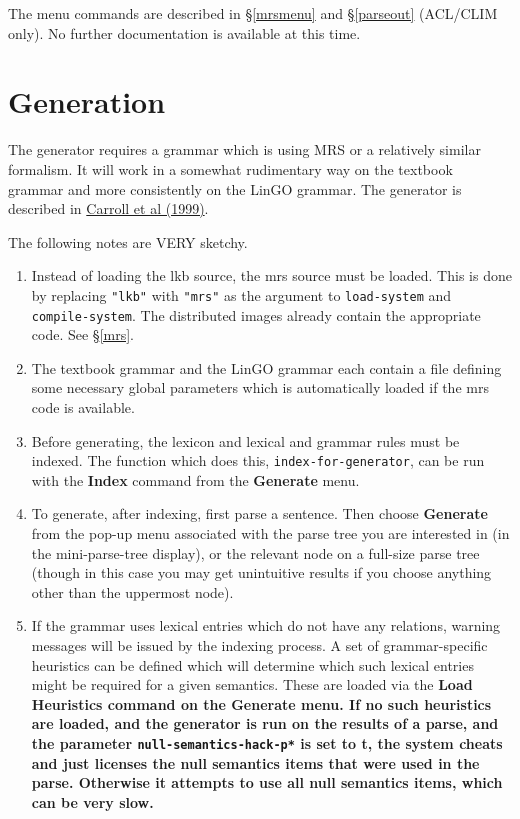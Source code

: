 \documentclass[12pt]{report}
\newcommand{\functionname}[1]{{\tt #1}}
\newcommand{\lkbparam}[1]{{\tt #1}}
\newcommand{\lkbmenucommand}{\bf}
\begin{document}
The menu commands are described in \S\ref{mrsmenu} and
\S\ref{parseout} (ACL/CLIM only).
No further documentation is available at this time.

\section{Generation}
\label{generator}

The generator requires a grammar which is using MRS or a relatively
similar formalism.  It will work in a somewhat rudimentary way on the
textbook grammar and more consistently
on the LinGO grammar.  The generator is described in 
\href{http://www-csli.stanford.edu/~aac/papers/generation.ps.gz}{Carroll et al (1999)}.

The following notes are VERY sketchy.
\begin{enumerate}
\item Instead of loading the lkb source, the mrs source must be loaded.  This
is done by replacing {\tt "lkb"} with {\tt "mrs"} as the argument to
\functionname{load-system} and \functionname{compile-system}.  
The distributed images
already contain the appropriate code.  See \S\ref{mrs}.
\item The textbook grammar and the LinGO grammar each
contain a file defining some necessary
global parameters which is automatically loaded if the mrs code is available.
\item Before generating, the lexicon and lexical and grammar rules
must be indexed.  The function which does this, 
\functionname{index-for-generator},
can be run with the {\lkbmenucommand Index} command
from the {\lkbmenucommand Generate} menu.
\item To generate, after indexing, first parse a sentence.  
Then choose {\lkbmenucommand Generate} from the
pop-up menu associated with the parse tree you are interested
in (in the mini-parse-tree display), or the relevant node on 
a full-size parse tree (though in this case you may get 
unintuitive results if you choose anything other than the uppermost node).
\item If the grammar uses lexical entries which do not have
any relations, warning messages will be issued by the indexing process.
A set of grammar-specific heuristics can be defined which will determine
which such lexical entries might be required for a given semantics.
These are loaded via the \lkbmenucommand{Load Heuristics} command
on the {\lkbmenucommand Generate} menu.  If no such heuristics are loaded,
and the generator is run on the results of a parse,
and the parameter \lkbparam{*null-semantics-hack-p*} is set to t,
the system cheats and just licenses the null semantics items that were used
in the parse.  Otherwise it attempts to use all
null semantics items, which can be very slow.
\end{enumerate}
\end{document}
